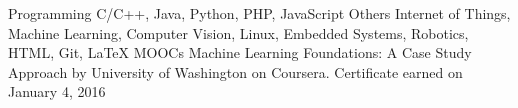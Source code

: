 \begin{cvskills}
  \cvskill
  	{Programming}
  	{C/C++, Java, Python, PHP, JavaScript}
   \cvskill
  	{Others}
  	{Internet of Things, Machine Learning, Computer Vision, Linux, Embedded Systems, Robotics, HTML, Git, LaTeX}
   \cvskill
    {MOOCs}
  	{Machine Learning Foundations: A Case Study Approach by University of Washington on Coursera. Certificate earned on January 4, 2016}
\end{cvskills}
